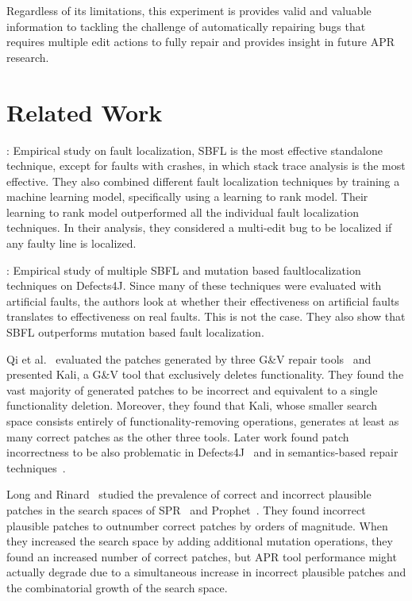 \documentclass[sigconf, timestamp-false, anonymous=true]{acmart}
\begin{document}
Regardless of its limitations, this experiment is provides valid and valuable 
information to tackling the challenge of automatically repairing bugs that 
requires multiple edit actions to fully repair 
and provides insight in future APR research.




\section{Related Work}

\cite{zou2019empirical}: Empirical study on fault localization, SBFL is the most effective standalone 
technique, except for faults with crashes, in which stack trace analysis is the most effective. They 
also combined different fault localization techniques by training a machine learning model, 
specifically using a learning to rank model. Their learning to rank model outperformed all the 
individual fault localization techniques. In their analysis, they considered a multi-edit bug to be 
localized if any faulty line is localized.

\cite{pearson2017evaluating}: Empirical study of multiple SBFL and mutation based faultlocalization 
techniques on Defects4J. Since many of these techniques were evaluated with artificial faults, the 
authors look at whether their effectiveness on artificial faults translates to effectiveness on real 
faults. This is not the case. They also show that SBFL outperforms mutation based fault localization.

Qi et al.~\cite{patch-correctness} evaluated the patches generated 
by three G\&V repair tools~\cite{genprog, ae, rsrepair} and presented 
Kali, a G\&V tool that exclusively deletes functionality. They found the 
vast majority of generated patches to be incorrect and equivalent to 
a single functionality deletion. Moreover, they found that Kali, whose 
smaller search space consists entirely of functionality-removing 
operations, generates at least as many correct patches as the 
other three tools. Later work found patch incorrectness to be 
also problematic in Defects4J~\cite{d4j-eval} and in semantics-based 
repair techniques~\cite{Le2018}.

Long and Rinard~\cite{long-search-spaces} studied the prevalence of 
correct and incorrect plausible patches in the search spaces of SPR~\cite{spr} 
and Prophet~\cite{prophet}. They found incorrect plausible patches to outnumber 
correct patches by orders of magnitude. When they increased the search space 
by adding additional mutation operations, they found an increased number of 
correct patches, but APR tool performance might actually degrade due to a 
simultaneous increase in incorrect plausible patches and the combinatorial 
growth of the search space.
\end{document}
